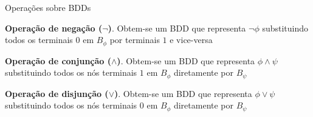 \expandafter\documentclass\expandafter[table, usenames, svgnames, dvipsnames,14pt, \classopts]{beamer}
\begin{document}
\begin{frame}{Operações sobre \uppercase{BDD}s}

    \begin{outline}
        \small
        \1 \textbf{Operação de negação ($\lnot$)}. Obtem-se um BDD que representa $\lnot{\phi}$ substituindo todos os terminais $0$ em $B_\phi$ por terminais $1$ e vice-versa
        
        \vspace{1em}
        
        \1 \textbf{Operação de conjunção ($\land$)}. Obtem-se um BDD que representa $\phi \land \psi$ substituindo todos os nós terminais $1$ em $B_\phi$ diretamente por $B_\psi$
        
        \vspace{1em}
        
        \1 \textbf{Operação de disjunção ($\lor$)}. Obtem-se um BDD que representa $\phi \lor \psi$ substituindo todos os nós terminais $0$ em $B_\phi$ diretamente por $B_\psi$
    \end{outline}

\end{frame}
\end{document}
